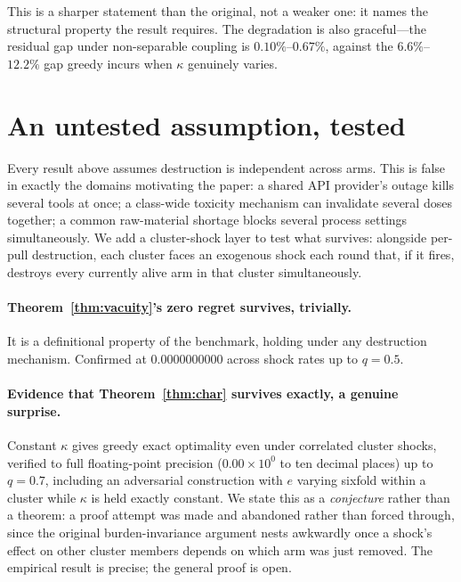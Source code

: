 This is a sharper statement than the original, not a weaker one: it names the
structural property the result requires. The degradation is also graceful---the
residual gap under non-separable coupling is $0.10\%$--$0.67\%$, against the
$6.6\%$--$12.2\%$ gap greedy incurs when $\kappa$ genuinely varies.

\section{An untested assumption, tested}
\label{sec:correlated}

Every result above assumes destruction is independent across arms. This is false
in exactly the domains motivating the paper: a shared API provider's outage kills
several tools at once; a class-wide toxicity mechanism can invalidate several doses
together; a common raw-material shortage blocks several process settings
simultaneously. We add a cluster-shock layer to test what survives: alongside
per-pull destruction, each cluster faces an exogenous shock each round that, if it
fires, destroys every currently alive arm in that cluster simultaneously.

\paragraph{Theorem~\ref{thm:vacuity}'s zero regret survives, trivially.} It is a
definitional property of the benchmark, holding under any destruction mechanism.
Confirmed at $0.0000000000$ across shock rates up to $q=0.5$.

\paragraph{Evidence that Theorem~\ref{thm:char} survives exactly, a genuine
surprise.} Constant $\kappa$ gives greedy exact optimality even under correlated
cluster shocks, verified to full floating-point precision ($0.00\times10^{0}$ to
ten decimal places) up to $q=0.7$, including an adversarial construction with $e$
varying sixfold within a cluster while $\kappa$ is held exactly constant. We state
this as a \emph{conjecture} rather than a theorem: a proof attempt was made and
abandoned rather than forced through, since the original burden-invariance
argument nests awkwardly once a shock's effect on other cluster members depends on
which arm was just removed. The empirical result is precise; the general proof is
open.

